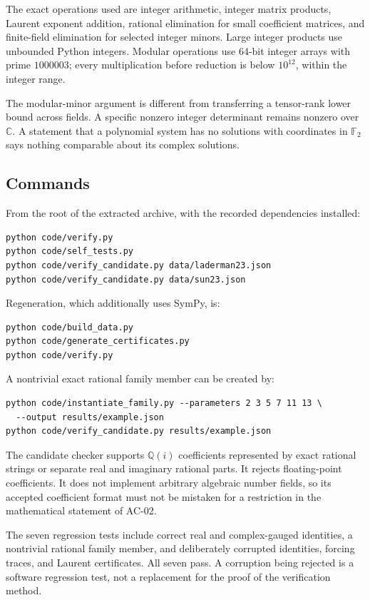 \documentclass[11pt,letterpaper]{article}
\theoremstyle{definition}\newtheorem{definition}[theorem]{Definition}
\theoremstyle{remark}\newtheorem{remark}[theorem]{Remark}
\newcommand{\CC}{\mathbb C}\newcommand{\ZZ}{\mathbb Z}\newcommand{\QQ}{\mathbb Q}
\begin{document}
The exact operations used are integer arithmetic, integer matrix products,
Laurent exponent addition, rational elimination for small coefficient
matrices, and finite-field elimination for selected integer minors. Large
integer products use unbounded Python integers. Modular operations use
64-bit integer arrays with prime $1000003$; every multiplication before
reduction is below $10^{12}$, within the integer range.

The modular-minor argument is different from transferring a tensor-rank
lower bound across fields. A specific nonzero integer determinant remains
nonzero over $\CC$. A statement that a polynomial system has no solutions
with coordinates in $\mathbb F_2$ says nothing comparable about its
complex solutions.

\subsection{Commands}
From the root of the extracted archive, with the recorded dependencies
installed:
\begin{lstlisting}
python code/verify.py
python code/self_tests.py
python code/verify_candidate.py data/laderman23.json
python code/verify_candidate.py data/sun23.json
\end{lstlisting}
Regeneration, which additionally uses SymPy, is:
\begin{lstlisting}
python code/build_data.py
python code/generate_certificates.py
python code/verify.py
\end{lstlisting}
A nontrivial exact rational family member can be created by:
\begin{lstlisting}
python code/instantiate_family.py --parameters 2 3 5 7 11 13 \
  --output results/example.json
python code/verify_candidate.py results/example.json
\end{lstlisting}
The candidate checker supports $\QQ(i)$ coefficients represented by exact
rational strings or separate real and imaginary rational parts. It rejects
floating-point coefficients. It does not implement arbitrary algebraic
number fields, so its accepted coefficient format must not be mistaken
for a restriction in the mathematical statement of AC-02.

The seven regression tests include correct real and complex-gauged
identities, a nontrivial rational family member, and deliberately
corrupted identities, forcing traces, and Laurent certificates. All seven
pass. A corruption being rejected is a software regression test, not a
replacement for the proof of the verification method.
\end{document}
